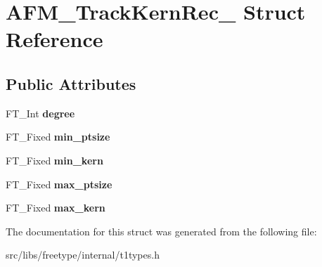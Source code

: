 \hypertarget{struct_a_f_m___track_kern_rec__}{
\section{AFM\_\-TrackKernRec\_\- Struct Reference}
\label{struct_a_f_m___track_kern_rec__}
}
\subsection*{Public Attributes}
\begin{DoxyCompactItemize}
\item 
\hypertarget{struct_a_f_m___track_kern_rec___a15272593c1a0ea05ca3687e7c2de26b6}{
FT\_\-Int {\bfseries degree}}
\label{struct_a_f_m___track_kern_rec___a15272593c1a0ea05ca3687e7c2de26b6}

\item 
\hypertarget{struct_a_f_m___track_kern_rec___a7b1e7fd74d92dcf2b89fee7f74d4fdba}{
FT\_\-Fixed {\bfseries min\_\-ptsize}}
\label{struct_a_f_m___track_kern_rec___a7b1e7fd74d92dcf2b89fee7f74d4fdba}

\item 
\hypertarget{struct_a_f_m___track_kern_rec___aee6f40c722e14ee2fb17948ce19d0499}{
FT\_\-Fixed {\bfseries min\_\-kern}}
\label{struct_a_f_m___track_kern_rec___aee6f40c722e14ee2fb17948ce19d0499}

\item 
\hypertarget{struct_a_f_m___track_kern_rec___a2b22a268fb0654a035ec59d3dfa3dfa4}{
FT\_\-Fixed {\bfseries max\_\-ptsize}}
\label{struct_a_f_m___track_kern_rec___a2b22a268fb0654a035ec59d3dfa3dfa4}

\item 
\hypertarget{struct_a_f_m___track_kern_rec___a8e25a36b738a2de3fa5c08e477b5a6a2}{
FT\_\-Fixed {\bfseries max\_\-kern}}
\label{struct_a_f_m___track_kern_rec___a8e25a36b738a2de3fa5c08e477b5a6a2}

\end{DoxyCompactItemize}


The documentation for this struct was generated from the following file:\begin{DoxyCompactItemize}
\item 
src/libs/freetype/internal/t1types.h\end{DoxyCompactItemize}

